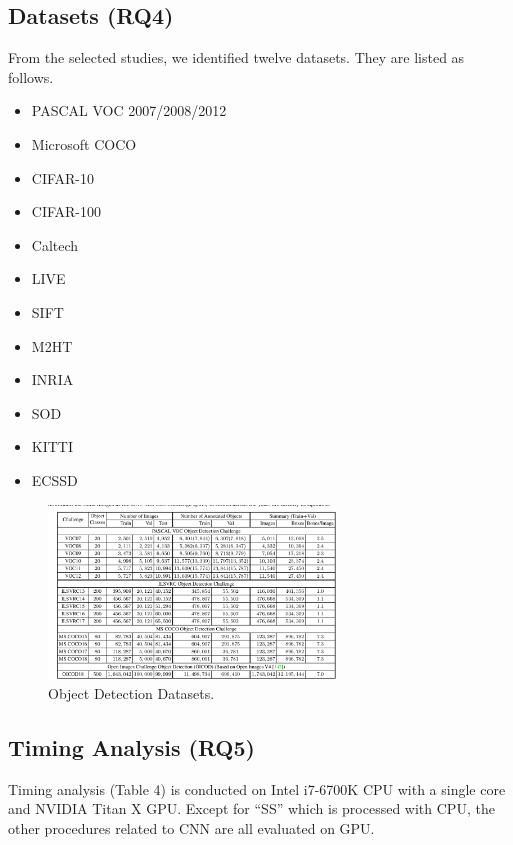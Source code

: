 \documentclass[two column]{ieeeaccess}
\begin{document}
\subsection{Datasets (RQ4)}
From the selected studies, we identified twelve datasets. They are listed as follows.
\begin{itemize}

    \item PASCAL VOC 2007/2008/2012
    
    \item Microsoft COCO
    
    \item CIFAR-10
    
    \item CIFAR-100
    
    \item Caltech
    
    \item LIVE
    
    \item SIFT
    
    \item M2HT
    
    \item INRIA
    
    \item SOD
    
    \item KITTI
    
    \item ECSSD

\end{itemize}

\begin{figure}[h]
    \centering
    \includegraphics[width=3in]{q4.PNG}
    \caption{Object Detection Datasets.}
    \label{fig16}
\end{figure}


\subsection{Timing Analysis (RQ5)}
Timing analysis (Table 4) is conducted on Intel i7-6700K CPU with a single core and NVIDIA Titan X GPU. Except for “SS” which is processed with CPU, the other procedures related to CNN are all evaluated on GPU.
\end{document}
